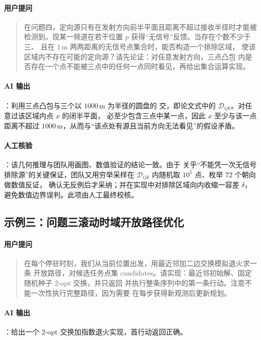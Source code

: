 \documentclass[UTF8,a4paper,12pt]{ctexart}
\begin{document}
\paragraph{用户提问}
\begin{quote}
在问题四，定向源只有在发射方向前半平面且距离不超过接收半径时才能被
检测到。现某一频道在若干位置 $p$ 获得“无信号”反馈。当存在个数不少于三、
且在 \(1\,\mathrm{m}\) 两两距离的无信号点集合时，能否构造一个排除区域，
使该区域内不存在可能的定向源？请先论证：对任意发射方向，三点凸包
内是否存在一个点不能被三点中的任何一点同时看见，再给出集合运算实现。
\end{quote}

\paragraph{AI 输出}：利用三点凸包与三个以 $1000\,\mathrm{m}$ 为半径的圆盘的
交，即论文式中的 $\mathcal{D}_{ijk}$。对任意过该区域内点 $x$ 的闭半平面，
必至少包含三点中某一点，因此 $x$ 至少与该一点距离不超过
$1000\,\mathrm{m}$，从而与“该点处有源且当前方向无法看见”的假设矛盾。

\paragraph{人工核验}：该几何推理与团队用画图、数值验证的结论一致。由于
关乎“不能凭一次无信号排除源”的关键保证，团队又用穷举采样在
$\mathcal{D}_{ijk}$ 内随机取 $10^5$ 点、枚举 $72$ 个朝向做数值反证，
确认无反例后才采纳；并在实现中对排除区域向内收缩一容差 $\delta$，
避免数值边界误判。此项由人工最终校核。

\subsection{示例三：问题三滚动时域开放路径优化}

\paragraph{用户提问}
\begin{quote}
在每个停驻时刻，我们从当前位置出发，用最近邻加二边交换模拟退火求一条
开放路径，对候选任务点集
candidates。请实现：最近邻初始解、固定随机种子 2-opt 交换，并只返回
并执行整条序列中的第一条行动。注意不能一次性执行完整路径，因为需要
在每步获得新观测后更新规划。
\end{quote}

\paragraph{AI 输出}：给出一个 2-opt 交换加指数退火实现，首行动返回正确。
\end{document}
